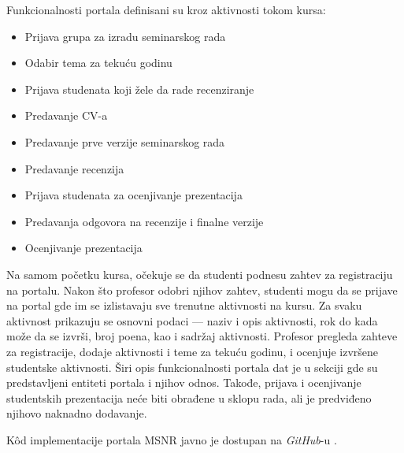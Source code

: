 \documentclass[12pt,oneside]{memoir}
\begin{document}
Funkcionalnosti portala definisani su kroz aktivnosti tokom kursa:
\begin{itemize}
  \item Prijava grupa za izradu seminarskog rada
  \item Odabir tema za tekuću godinu
  \item Prijava studenata koji žele da rade recenziranje
  \item Predavanje CV-a
  \item Predavanje prve verzije seminarskog rada
  \item Predavanje recenzija
  \item Prijava studenata za ocenjivanje prezentacija
  \item Predavanja odgovora na recenzije i finalne verzije
  \item Ocenjivanje prezentacija 
\end{itemize}


Na samom početku kursa, očekuje se da studenti podnesu zahtev za registraciju na portalu. Nakon što profesor odobri njihov zahtev,
studenti mogu da se prijave na portal gde im se izlistavaju sve trenutne aktivnosti na kursu. Za svaku aktivnost prikazuju se osnovni
podaci --- naziv i opis aktivnosti, rok do kada može da se izvrši, broj poena, kao i sadržaj aktivnosti. Profesor pregleda
zahteve za registracije, dodaje aktivnosti i teme za tekuću godinu, i ocenjuje izvršene studentske aktivnosti.
Širi opis funkcionalnosti portala dat je u sekciji gde su predstavljeni entiteti portala i njihov odnos. Takođe, prijava i ocenjivanje
studentskih prezentacija neće biti obrađene u sklopu rada, ali je predviđeno njihovo naknadno dodavanje.

K\^{o}d implementacije portala MSNR javno je dostupan na \emph{GitHub}-u \cite{msnr-portal}.
\end{document}

